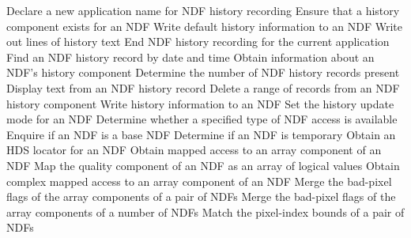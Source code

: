 \begin{latexonly}
            {Declare a new application name for NDF history recording}
            {Ensure that a history component exists for an NDF}
            {Write default history information to an NDF}
            {Write out lines of history text}
            {End NDF history recording for the current application}
            {Find an NDF history record by date and time}
            {Obtain information about an NDF's history component}
            {Determine the number of NDF history records present}
            {Display text from an NDF history record}
            {Delete a range of records from an NDF history component}
            {Write history information to an NDF}
            {Set the history update mode for an NDF}
            {Determine whether a specified type of NDF access is available}
            {Enquire if an NDF is a base NDF}
            {Determine if an NDF is temporary}
            {Obtain an HDS locator for an NDF}
            {Obtain mapped access to an array component of an NDF}
            {Map the quality component of an NDF as an array of logical values}
            {Obtain complex mapped access to an array component of an NDF}
            {Merge the bad-pixel flags of the array components of a pair of NDFs}
            {Merge the bad-pixel flags of the array components of a number of NDFs}
            {Match the pixel-index bounds of a pair of NDFs}

\end{latexonly}

